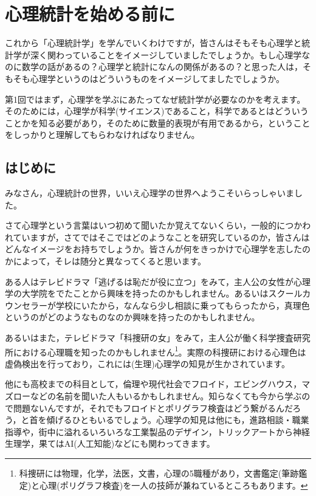 \documentclass{ltjsbook}
\begin{document}
 
\chapter{心理統計を始める前に} 
\label{chapter1} 
これから「心理統計学」を学んでいくわけですが，皆さんはそもそも心理学と統計学が深く関わっていることをイメージしていましたでしょうか。もし心理学なのに数学の話があるの？心理学と統計になんの関係があるの？と思った人は，そもそも心理学というのはどういうものをイメージしてましたでしょうか。

第1回ではまず，心理学を学ぶにあたってなぜ統計学が必要なのかを考えます。そのためには，心理学が科学(サイエンス)であること，科学であるとはどういうことかを知る必要があり，そのために数量的表現が有用であるから，ということをしっかりと理解してもらわなければなりません。

\section{はじめに} 

みなさん，心理統計の世界，いいえ心理学の世界へようこそいらっしゃいました。

さて心理学という言葉はいつ初めて聞いたか覚えてないくらい，一般的につかわれていますが，さてではそこではどのようなことを研究しているのか，皆さんはどんなイメージをお持ちでしょうか。皆さんが何をきっかけで心理学を志したのかによって，そレは随分と異なってくると思います。

ある人はテレビドラマ「逃げるは恥だが役に立つ」をみて，主人公の女性が心理学の大学院をでたことから興味を持ったのかもしれません。あるいはスクールカウンセラーが学校にいたから，なんなら少し相談に乗ってもらったから，真理色というのがどのようなものなのか興味を持ったのかもしれません。

あるいはまた，テレビドラマ「科捜研の女」をみて，主人公が働く科学捜査研究所における心理職を知ったのかもしれません\footnote{科捜研には物理，化学，法医，文書，心理の5職種があり，文書鑑定(筆跡鑑定)と心理(ポリグラフ検査)を一人の技師が兼ねているところもあります。}。実際の科捜研における心理色は虚偽検出を行っており，これには(生理)心理学の知見が生かされています。

他にも高校までの科目として，倫理や現代社会でフロイド，エビングハウス，マズローなどの名前を聞いた人もいるかもしれません。知らなくても今から学ぶので問題ないんですが，それでもフロイドとポリグラフ検査はどう繋がるんだろう，と首を傾げるひともいるでしょう。心理学の知見は他にも，進路相談・職業指導や，街中に溢れるいろいろな工業製品のデザイン，トリックアートから神経生理学，果てはAI(人工知能)などにも関わってきます。
\end{document}
